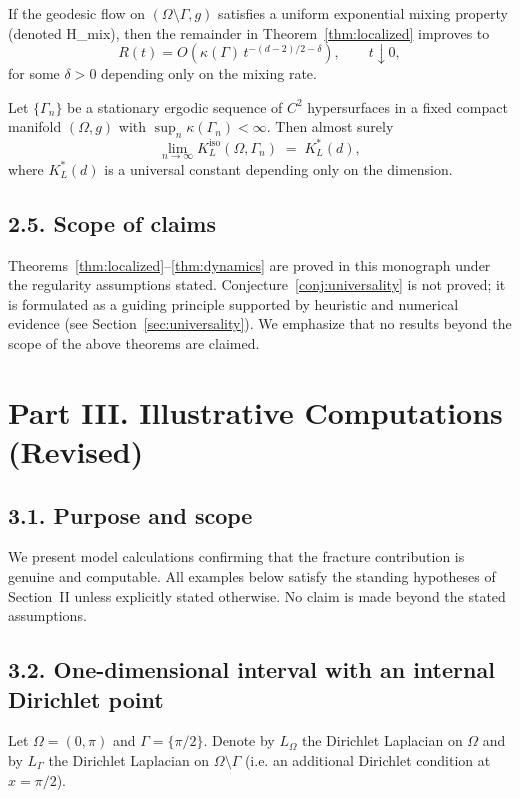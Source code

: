 \begin{theorem}\label{thm:dynamics}
If the geodesic flow on $(\Omega \setminus \Gamma,g)$ satisfies a uniform exponential mixing property (denoted H\_mix), then the remainder in Theorem~\ref{thm:localized} improves to
\[
R(t) = O\!\left(\kappa(\Gamma)\, t^{-(d-2)/2 - \delta}\right),
\qquad t \downarrow 0,
\]
for some $\delta > 0$ depending only on the mixing rate.
\end{theorem}

\begin{conjecture}[Universality]\label{conj:universality}
Let $\{\Gamma_n\}$ be a stationary ergodic sequence of $C^2$ hypersurfaces in a fixed compact manifold $(\Omega,g)$ with $\sup_n \kappa(\Gamma_n) < \infty$. 
Then almost surely
\[
\lim_{n\to\infty} K_L^{\mathrm{iso}}(\Omega,\Gamma_n) \;=\; K_L^*(d),
\]
where $K_L^*(d)$ is a universal constant depending only on the dimension.
\end{conjecture}

\subsection*{2.5. Scope of claims}
Theorems~\ref{thm:localized}--\ref{thm:dynamics} are proved in this monograph under the regularity assumptions stated. 
Conjecture~\ref{conj:universality} is not proved; it is formulated as a guiding principle supported by heuristic and numerical evidence (see Section~\ref{sec:universality}). 
We emphasize that no results beyond the scope of the above theorems are claimed.

\section*{Part III. Illustrative Computations (Revised)}

\subsection*{3.1. Purpose and scope}
We present model calculations confirming that the fracture contribution is genuine and computable. All examples below satisfy the standing hypotheses of Section~II unless explicitly stated otherwise. No claim is made beyond the stated assumptions.

\subsection*{3.2. One-dimensional interval with an internal Dirichlet point}
Let $\Omega=(0,\pi)$ and $\Gamma=\{\pi/2\}$. Denote by $L_\Omega$ the Dirichlet Laplacian on $\Omega$ and by $L_\Gamma$ the Dirichlet Laplacian on $\Omega\setminus\Gamma$ (i.e. an additional Dirichlet condition at $x=\pi/2$).

